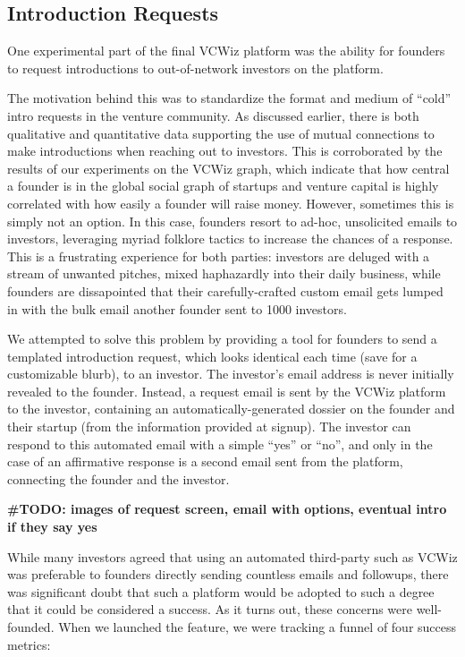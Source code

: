 \subsection{Introduction Requests}

One experimental part of the final VCWiz platform was the ability for founders to request introductions to out-of-network investors on the platform.

The motivation behind this was to standardize the format and medium of ``cold'' intro requests in the venture community. As discussed earlier, there is both qualitative and quantitative data supporting the use of mutual connections to make introductions when reaching out to investors. This is corroborated by the results of our experiments on the VCWiz graph, which indicate that how central a founder is in the global social graph of startups and venture capital is highly correlated with how easily a founder will raise money. However, sometimes this is simply not an option. In this case, founders resort to ad-hoc, unsolicited emails to investors, leveraging myriad folklore tactics to increase the chances of a response. This is a frustrating experience for both parties: investors are deluged with a stream of unwanted pitches, mixed haphazardly into their daily business, while founders are dissapointed that their carefully-crafted custom email gets lumped in with the bulk email another founder sent to 1000 investors.

We attempted to solve this problem by providing a tool for founders to send a templated introduction request, which looks identical each time (save for a customizable blurb), to an investor. The investor's email address is never initially revealed to the founder. Instead, a request email is sent by the VCWiz platform to the investor, containing an automatically-generated dossier on the founder and their startup (from the information provided at signup). The investor can respond to this automated email with a simple ``yes'' or ``no'', and only in the case of an affirmative response is a second email sent from the platform, connecting the founder and the investor.

\textbf{\#TODO: images of request screen, email with options, eventual intro if they say yes}

While many investors agreed that using an automated third-party such as VCWiz was preferable to founders directly sending countless emails and followups, there was significant doubt that such a platform would be adopted to such a degree that it could be considered a success. As it turns out, these concerns were well-founded. When we launched the feature, we were tracking a funnel of four success metrics:

